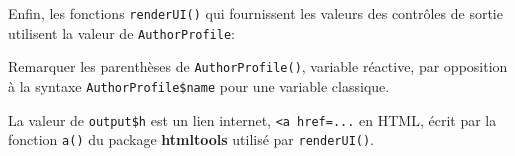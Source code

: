 \documentclass[
  11pt,
  french,
  a4paper,
  extrafontsizes,onecolumn,openright
  ]{memoir}
\newenvironment{Shaded}{\begin{snugshade}}{\end{snugshade}}
\newcommand{\AttributeTok}[1]{\textcolor[rgb]{0.77,0.63,0.00}{#1}}
\newcommand{\CommentTok}[1]{\textcolor[rgb]{0.56,0.35,0.01}{\textit{#1}}}
\newcommand{\FunctionTok}[1]{\textcolor[rgb]{0.00,0.00,0.00}{#1}}
\newcommand{\NormalTok}[1]{#1}
\newcommand{\OtherTok}[1]{\textcolor[rgb]{0.56,0.35,0.01}{#1}}
\newcommand{\SpecialCharTok}[1]{\textcolor[rgb]{0.00,0.00,0.00}{#1}}
\newcommand{\StringTok}[1]{\textcolor[rgb]{0.31,0.60,0.02}{#1}}
\begin{document}
\scriptsize

\begin{Shaded}
\end{Shaded}

\normalsize

Enfin, les fonctions \texttt{renderUI()} qui fournissent les valeurs des contrôles de sortie utilisent la valeur de \texttt{AuthorProfile}:

\scriptsize

\begin{Shaded}
\end{Shaded}

\normalsize

Remarquer les parenthèses de \texttt{AuthorProfile()}, variable réactive, par opposition à la syntaxe \texttt{AuthorProfile\$name} pour une variable classique.

La valeur de \texttt{output\$h} est un lien internet, \texttt{\textless{}a\ href=...} en HTML, écrit par la fonction \texttt{a()} du package \textbf{htmltools} utilisé par \texttt{renderUI()}.

\scriptsize

\begin{Shaded}
\end{Shaded}
\end{document}
